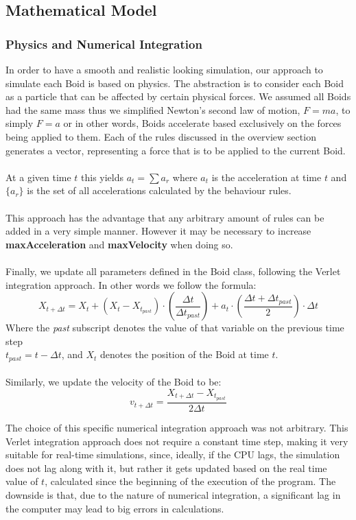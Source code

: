 \documentclass[12pt]{article}
\begin{document}
\subsection{Mathematical Model}
\subsubsection{Physics and Numerical Integration}
In order to have a smooth and realistic looking simulation, our approach to simulate each Boid is based on physics. The abstraction is to consider each Boid as a particle that can be affected by certain physical forces. We assumed all Boids had the same mass thus we simplified Newton's second law of motion, $F=ma$, to simply $F=a$ or in other words, Boids accelerate based exclusively on the forces being applied to them. Each of the rules discussed in the overview section generates a vector, representing a force that is to be applied to the current Boid. 
\\ \\
At a given time $t$ this yields $a_t = \sum a_r$ where $a_t$ is the acceleration at time $t$ and $\{a_r\}$ is the set of all accelerations calculated by the behaviour rules. 
\\ \\
This approach has the advantage that any arbitrary amount of rules can be added in a very simple manner. However it may be necessary to increase \textbf{maxAcceleration} and \textbf{maxVelocity} when doing so.
\\ \\
Finally, we update all parameters defined in the Boid class, following the Verlet integration approach. In other words we follow the formula:
$$X_{t+\Delta t} = X_t + (X_t-X_{t_{past}})\cdot(\frac{\Delta t}{\Delta t_{past}}) + a_t\cdot(\frac{\Delta t + \Delta t_{past}}{2})\cdot\Delta t$$
Where the \textit{past} subscript denotes the value of that variable on the previous time step\\
$t_{past}=t-\Delta t$, and $X_t$ denotes the position of the Boid at time $t$.
\\ \\
Similarly, we update the velocity of the Boid to be: 
$$v_{t+\Delta t} = \frac{X_{t+\Delta t} - X_{t_{past}}}{2\Delta t}$$

The choice of this specific numerical integration approach was not arbitrary. This Verlet integration approach does not require a constant time step, making it very suitable for real-time simulations, since, ideally, if the CPU lags, the simulation does not lag along with it, but rather it gets updated based on the real time value of $t$, calculated since the beginning of the execution of the program. The downside is that, due to the nature of numerical integration, a significant lag in the computer may lead to big errors in calculations.
\end{document}
